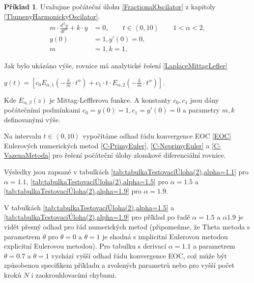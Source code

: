 \documentclass[a4paper,12pt,twoside]{article}
\theoremstyle{definition}
\newtheorem{prikl}[veta]{Příklad}
\theoremstyle{remark}
\numberwithin{equation}{section}
\numberwithin{table}{section}
\numberwithin{figure}{section}
\begin{document}
\begin{prikl}\label{TestUlohaOsciator}
	Uvažujme počáteční úlohu \eqref{FractionalOscilator} z kapitoly \ref{TlumenyHarmonickyOscilator}.
	\begin{equation*}
		\begin{aligned}
			m \cdot \frac{d^{\alpha} y}{d t^{\alpha}} + k \cdot y &= 0, \qquad t \in \left\langle 0, 10\right\rangle \qquad 1 < \alpha <2,  \\
			y\left(0\right) &= 1, y'\left(0\right) = 0, \\
			m &= 1, k = 1, 
		\end{aligned}
	\end{equation*}

	Jak bylo ukázáno výše, rovnice má analytické řešení \eqref{LaplaceMittagLefler}

	\begin{center}
		$	y\left(t\right) = \left[ c_{0} E_{\alpha, 1}\left(-\frac{k}{m}\cdot t^{\alpha}\right) + c_{1}\cdot t \cdot E_{\alpha, 2} \left(-\frac{k}{m}\cdot t ^{\alpha}\right)\right] .$
	\end{center}%

	Kde  $E_{\alpha, \beta}\left(z\right)$ je Mittag-Lefflerova funkce.
	A konstanty $c_{0}, c_{1}$ jsou dány počátečními  podmínkami $c_{0} = y\left(0\right) = 1, c_{1} = y'\left(0\right) = 0$ a parametry $m, k$ definovanými výše. 

	Na intervalu $t \in \left\langle 0, 10\right\rangle $ vypočítáme odhad řádu konvergence EOC \eqref{EOC} Eulerových numerických metod \eqref{C-PrimyEuler}, \eqref{C-NeprimyEuler} a \eqref{C-VazenaMetoda} pro řešení počáteční úlohy zlomkové diferenciální rovnice.
	
	Výsledky jsou zapsané v tabulkách \ref{tab:tabulkaTestovacíÚloha(2),alpha=1.1} pro $\alpha = 1.1$, \ref{tab:tabulkaTestovacíÚloha(2),alpha=1.5} pro $\alpha = 1.5$ a \ref{tab:tabulkaTestovacíÚloha(2),alpha=1.9} pro $\alpha = 1.9$. 
	
	V tabulkách \ref{tab:tabulkaTestovacíÚloha(2),alpha=1.5} a \ref{tab:tabulkaTestovacíÚloha(2),alpha=1.9} pro příklad  po řadě $\alpha = 1.5$ a $\alpha 1.9$  je vidět přesný odhad pro řád numerických metod (připomeňme, že Theta metoda s parametrem $\theta$ pro $\theta = 0$ a  $\theta = 1$ je shodná s implicitní Eulerovou metodou explicitní Eulerovou metodou). Pro tabulku s derivací $\alpha =1.1$ a parametrem $\theta = 0.7$ a $\theta = 1$ vychází vyšší odhad řádu konvergence EOC, což může být způsobenou specifikem příkladu a zvolených parametrů nebo pro vyšší počet kroků $N$ i zaokrouhlovacími chybami.
\end{prikl}
\end{document}
